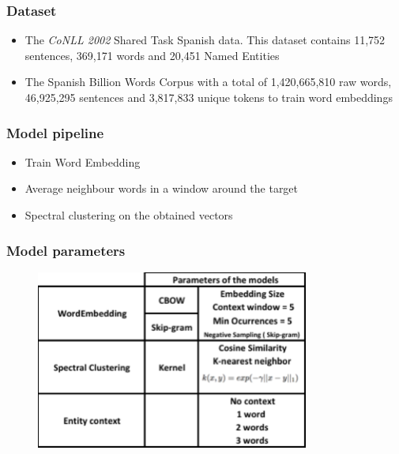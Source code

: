 \documentclass{beamer}
\begin{document}
\begin{frame}
	\frametitle{Dataset}
	\begin{itemize} 
    \item The \emph{CoNLL 2002} Shared Task Spanish data. This dataset contains 11,752 sentences, 369,171 words and 20,451 Named Entities
    \end{itemize} 

\begin{itemize} 
	\item The Spanish Billion Words Corpus  with a total of 1,420,665,810 raw words,  46,925,295 sentences and 3,817,833 unique tokens to train word embeddings
\end{itemize} 
\end{frame}

\begin{frame}
\frametitle{Model pipeline}
\begin{itemize}
\item Train Word Embedding
\item Average neighbour words in a window around the target
\item Spectral clustering on the obtained vectors
\end{itemize}
\end{frame}

\begin{frame}
\frametitle{Model parameters}
\begin{figure}[h]
	\centering
	\includegraphics[width=0.8\textwidth]{../REPORT/Figures_Mik/Parameters.png}
	\label{fig:params}
\end{figure}

\end{frame}
\end{document}
